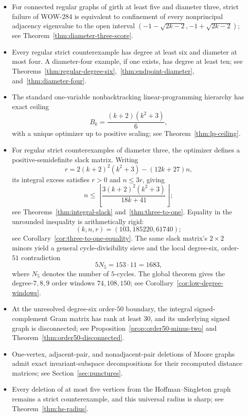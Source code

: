 \documentclass[a4paper,10pt,reqno]{amsart}
\theoremstyle{plain}
\theoremstyle{definition}
\theoremstyle{remark}
\begin{document}
\begin{itemize}
\item For connected regular graphs of girth at least five and diameter three,
strict failure of WOW-284 is equivalent to confinement of every nonprincipal
adjacency eigenvalue to the open interval
\((-1-\sqrt{2k-2},-1+\sqrt{2k-2})\); see
Theorem~\ref{thm:diameter-three-score}.
\item Every regular strict counterexample has degree at least six and diameter
at most four.  A diameter-four example, if one exists, has degree at least ten;
see Theorems~\ref{thm:regular-degree-six},~\ref{thm:endpoint-diameter},
and~\ref{thm:diameter-four}.
\item The standard one-variable nonbacktracking linear-programming hierarchy
has exact ceiling
\[
 B_k=\frac{(k+2)(k^2+3)}6,
\]
with a unique optimizer up to positive scaling; see
Theorem~\ref{thm:lp-ceiling}.
\item For regular strict counterexamples of diameter three, the optimizer
defines a positive-semidefinite slack matrix.  Writing
\[
 r=2(k+2)^2(k^2+3)-(12k+27)n,
\]
its integral excess satisfies \(r>0\) and \(n\le3r\), giving
\[
 n\le\left\lfloor
 \frac{3(k+2)^2(k^2+3)}{18k+41}
 \right\rfloor;
\]
 see Theorems~\ref{thm:integral-slack} and~\ref{thm:three-to-one}.  Equality
 in the unrounded inequality is arithmetically rigid:
 \[
  (k,n,r)=(103,185220,61740);
 \]
 see Corollary~\ref{cor:three-to-one-equality}.  The same slack matrix's
\(2\times2\) minors yield a general cycle-divisibility sieve and the local
degree-six, order-\(51\) contradiction
\[
 5N_5=153\cdot11=1683,
\]
where \(N_5\) denotes the number of \(5\)-cycles.  The global theorem gives
the degree-\(7,8,9\) order windows
\(74,108,150\); see Corollary~\ref{cor:low-degree-windows}.
\item At the unresolved degree-six order-\(50\) boundary, the integral
signed-complement Gram matrix has rank at least \(30\), and its underlying
signed graph is disconnected; see Proposition~\ref{prop:order50-minus-two}
and Theorem~\ref{thm:order50-disconnected}.
\item One-vertex, adjacent-pair, and nonadjacent-pair deletions of Moore graphs
admit exact invariant-subspace decompositions for their recomputed distance
matrices; see Section~\ref{sec:punctures}.
\item Every deletion of at most five vertices from the Hoffman--Singleton graph
remains a strict counterexample, and this universal radius is sharp; see
Theorem~\ref{thm:hs-radius}.
\end{itemize}
\end{document}
